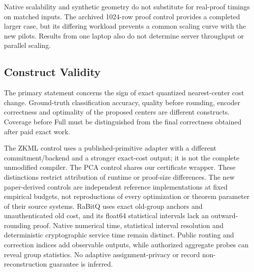 Native scalability and synthetic geometry do not substitute for real-proof
timings on matched inputs. The archived 1024-row proof control provides a
completed larger case, but its differing workload prevents a common scaling
curve with the new pilots. Results from one laptop also do not determine
server throughput or parallel scaling.

\subsection{Construct Validity}
The primary statement concerns the sign of exact quantized nearest-center
cost change. Ground-truth classification accuracy, quality before rounding,
encoder correctness and optimality of the proposed centers are different
constructs. Coverage before Full must be distinguished from the final
correctness obtained after paid exact work.

The ZKML control uses a published-primitive adapter with a different
commitment/backend and a stronger exact-cost output; it is not the complete
unmodified compiler. The PCA control shares our certificate wrapper.
These distinctions restrict attribution of runtime or proof-size differences.
The new paper-derived controls are independent reference implementations
at fixed empirical budgets, not reproductions of every optimization or
theorem parameter of their source systems. RaBitQ uses exact old-group
anchors and unauthenticated old cost, and its float64 statistical intervals
lack an outward-rounding proof. Native numerical time, statistical interval
resolution and deterministic cryptographic service time remain distinct.
Public routing and correction indices add observable outputs, while
authorized aggregate probes can reveal group statistics. No adaptive
assignment-privacy or record non-reconstruction guarantee is inferred.

